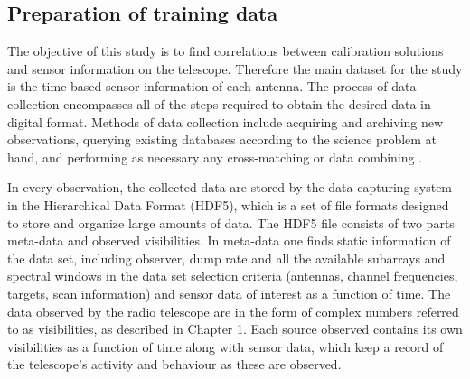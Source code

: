 \subsection{Preparation of training data}\label{prep}

The objective of this study is to find correlations between
calibration solutions and sensor information on the telescope.
Therefore the main dataset for the study is the time-based
sensor information of each antenna.
The process of data collection encompasses all of the steps required to obtain the desired data in digital format. Methods of data collection include acquiring and archiving new observations, querying existing databases according to the science
problem at hand, and performing as necessary any cross-matching or data combining  \citep{ball2010data}.


In every observation, the collected data are stored by the data capturing system in the Hierarchical Data Format (HDF5), which is a set of file formats designed to store and organize large amounts of data. The HDF5 file consists of two parts meta-data and observed visibilities. In meta-data one finds static information of the data set, including observer, dump rate and all the available subarrays and spectral windows in the data set selection criteria (antennas, channel frequencies, targets, scan information) and sensor data of interest as a function of time. The data observed by the radio telescope are in the  form of complex numbers referred to as visibilities, as described in Chapter 1. Each source observed contains its own visibilities as a function of time along with sensor data,  which keep a record of the telescope's activity and behaviour as these are observed.

